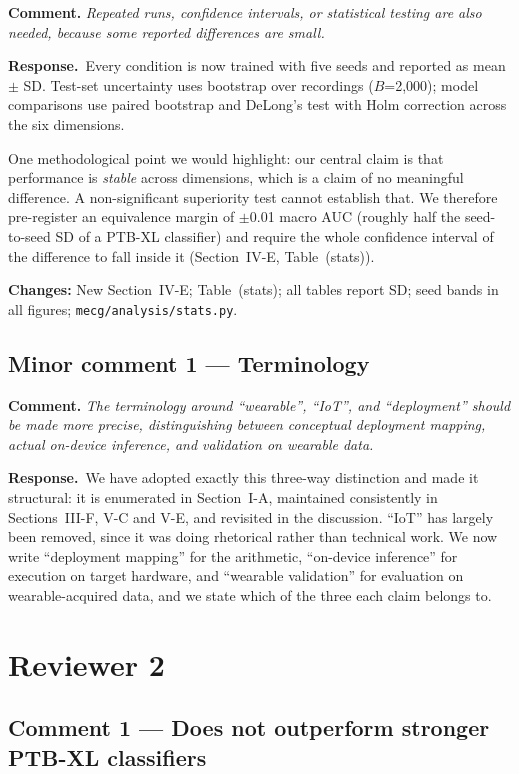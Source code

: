 \documentclass[11pt,a4paper]{article}
\newcommand{\comment}[1]{\par\medskip\noindent\textcolor{revblue}{\textbf{Comment.} \textit{#1}}\par\smallskip}
\newcommand{\response}{\par\noindent\textbf{Response.}\ }
\newcommand{\changed}[1]{\par\smallskip\noindent\textbf{Changes:} #1\par}
\begin{document}
\comment{Repeated runs, confidence intervals, or statistical testing are also
needed, because some reported differences are small.}

\response Every condition is now trained with five seeds and reported as mean
$\pm$ SD. Test-set uncertainty uses bootstrap over recordings ($B$=2{,}000);
model comparisons use paired bootstrap and DeLong's test with Holm correction
across the six dimensions.

One methodological point we would highlight: our central claim is that
performance is \emph{stable} across dimensions, which is a claim of no
meaningful difference. A non-significant superiority test cannot establish
that. We therefore pre-register an equivalence margin of $\pm$0.01 macro AUC
(roughly half the seed-to-seed SD of a PTB-XL classifier) and require the
whole confidence interval of the difference to fall inside it
(Section~IV-E, Table~(stats)).

\changed{New Section~IV-E; Table~(stats); all tables report SD; seed bands in
all figures; \texttt{mecg/analysis/stats.py}.}

\subsection*{Minor comment 1 --- Terminology}

\comment{The terminology around ``wearable'', ``IoT'', and ``deployment''
should be made more precise, distinguishing between conceptual deployment
mapping, actual on-device inference, and validation on wearable data.}

\response We have adopted exactly this three-way distinction and made it
structural: it is enumerated in Section~I-A, maintained consistently in
Sections~III-F, V-C and V-E, and revisited in the discussion. ``IoT'' has
largely been removed, since it was doing rhetorical rather than technical
work. We now write ``deployment mapping'' for the arithmetic,
``on-device inference'' for execution on target hardware, and ``wearable
validation'' for evaluation on wearable-acquired data, and we state which of
the three each claim belongs to.

\section{Reviewer 2}

\subsection*{Comment 1 --- Does not outperform stronger PTB-XL classifiers}
\end{document}
